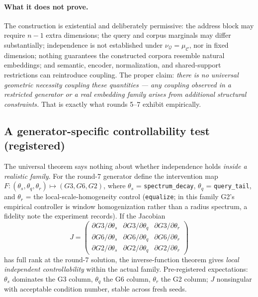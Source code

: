 \documentclass[11pt]{article}
\newcommand{\muC}{\mu_{\mathcal{C}}}
\newcommand{\nuQ}{\nu_{\mathcal{Q}}}
\begin{document}
\paragraph{What it does not prove.} The construction is existential and
deliberately permissive: the address block may require $n-1$ extra dimensions;
the query and corpus marginals may differ substantially; independence is not
established under $\nuQ = \muC$, nor in fixed dimension; nothing guarantees
the constructed corpora resemble natural embeddings; and semantic, encoder,
normalization, and shared-support restrictions can reintroduce coupling. The
proper claim: \emph{there is no universal geometric necessity coupling these
quantities --- any coupling observed in a restricted generator or a real
embedding family arises from additional structural constraints.} That is
exactly what rounds 5--7 exhibit empirically.

\subsection{A generator-specific controllability test (registered)}
\label{sec:jacobian}

The universal theorem says nothing about whether independence holds
\emph{inside a realistic family}. For the round-7 generator define the
intervention map
$F : (\theta_s, \theta_q, \theta_r) \mapsto (G3, G6, G2)$, where $\theta_s$ =
\texttt{spectrum\_decay}, $\theta_q$ = \texttt{query\_tail}, and $\theta_r$ =
the local-scale-homogeneity control (\texttt{equalize}; in this family G2's
empirical controller is window homogenization rather than a radius spectrum,
a fidelity note the experiment records). If the Jacobian
\[
J = \begin{pmatrix}
\partial G3/\partial\theta_s & \partial G3/\partial\theta_q & \partial G3/\partial\theta_r\\
\partial G6/\partial\theta_s & \partial G6/\partial\theta_q & \partial G6/\partial\theta_r\\
\partial G2/\partial\theta_s & \partial G2/\partial\theta_q & \partial G2/\partial\theta_r
\end{pmatrix}
\]
has full rank at the round-7 solution, the inverse-function theorem gives
\emph{local independent controllability} within the actual family.
Pre-registered expectations: $\theta_s$ dominates the G3 column, $\theta_q$
the G6 column, $\theta_r$ the G2 column; $J$ nonsingular with acceptable
condition number, stable across fresh seeds.
\end{document}
